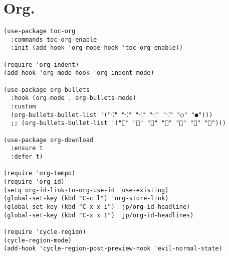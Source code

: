 \documentclass[11pt]{article}
\begin{document}
\section{Org.}
\label{sec:orge915a1a}
\begin{verbatim}
(use-package toc-org
  :commands toc-org-enable
  :init (add-hook 'org-mode-hook 'toc-org-enable))

(require 'org-indent)
(add-hook 'org-mode-hook 'org-indent-mode)

(use-package org-bullets
  :hook (org-mode . org-bullets-mode)
  :custom
  (org-bullets-bullet-list '("⁖" "⁖" "⁖" "⁖" "⁖" "○" "●")))
  ;; (org-bullets-bullet-list '("" "" "" "" "" "" "")))

(use-package org-download
  :ensure t
  :defer t)

(require 'org-tempo)
(require 'org-id)
(setq org-id-link-to-org-use-id 'use-existing)
(global-set-key (kbd "C-c l") 'org-store-link)
(global-set-key (kbd "C-x x i") 'jp/org-id-headline)
(global-set-key (kbd "C-x x I") 'jp/org-id-headlines)

(require 'cycle-region)
(cycle-region-mode)
(add-hook 'cycle-region-post-preview-hook 'evil-normal-state)
\end{verbatim}
\end{document}
